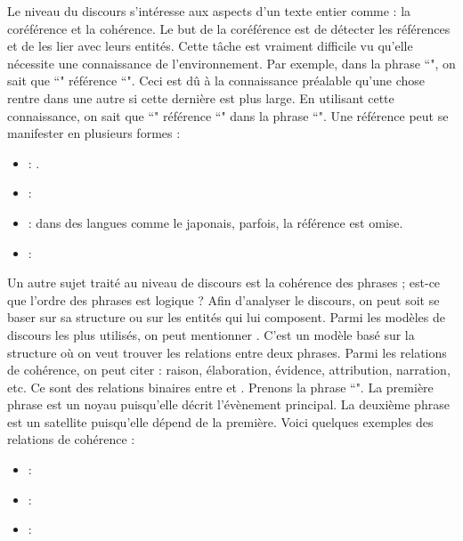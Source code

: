 \documentclass{KodeBook}
\begin{document}
Le niveau du discours s'intéresse aux aspects d'un texte entier comme : la coréférence et la cohérence.
Le but de la coréférence est de détecter les références et de les lier avec leurs entités. 
Cette tâche est vraiment difficile vu qu'elle nécessite une connaissance de l'environnement. 
Par exemple, dans la phrase ``", on sait que ``" référence ``". 
Ceci est dû à la connaissance préalable qu'une chose rentre dans une autre si cette dernière est plus large.
En utilisant cette connaissance, on sait que ``" référence ``" dans la phrase ``".
Une référence peut se manifester en plusieurs formes :
\begin{itemize}
	\item {} : .
	\item {} : 
	\item {} : dans des langues comme le japonais, parfois, la référence est omise.
	\item {} : 
\end{itemize}

Un autre sujet traité au niveau de discours est la cohérence des phrases ; est-ce que l'ordre des phrases est logique ?
Afin d'analyser le discours, on peut soit se baser sur sa structure ou sur les entités qui lui composent. 
Parmi les modèles de discours les plus utilisés, on peut mentionner .
C'est un modèle basé sur la structure où on veut trouver les relations entre deux phrases. 
Parmi les relations de cohérence, on peut citer : raison, élaboration, évidence, attribution, narration, etc.
Ce sont des relations binaires entre  et .
Prenons la phrase ``".
La première phrase est un noyau puisqu'elle décrit l'évènement principal.
La deuxième phrase est un satellite puisqu'elle dépend de la première.
Voici quelques exemples des relations de cohérence : 
\begin{itemize}
	\item {} : 
	\item {} : 
	\item {} : 
\end{itemize}
\end{document}
